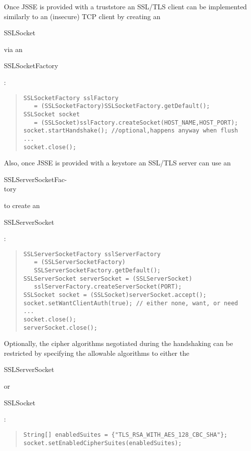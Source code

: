 Once JSSE is provided with a truststore an SSL/TLS client can be
implemented similarly to an (insecure) TCP client by creating an \begin{code}SSLSocket\end{code}
via an \begin{code}SSLSocketFactory\end{code}:
\begin{quote}\begin{code}\begin{verbatim}
SSLSocketFactory sslFactory
   = (SSLSocketFactory)SSLSocketFactory.getDefault();
SSLSocket socket
   = (SSLSocket)sslFactory.createSocket(HOST_NAME,HOST_PORT);
socket.startHandshake(); //optional,happens anyway when flush
...
socket.close();
\end{verbatim}\end{code}\end{quote}
Also, once JSSE is provided with a keystore an SSL/TLS server can use an
\begin{code}SSLServerSocketFac-\\tory\end{code} to create an \begin{code}SSLServerSocket\end{code}:
\begin{quote}\begin{code}\begin{verbatim}
SSLServerSocketFactory sslServerFactory
   = (SSLServerSocketFactory)
   SSLServerSocketFactory.getDefault();
SSLServerSocket serverSocket = (SSLServerSocket)
   sslServerFactory.createServerSocket(PORT);
SSLSocket socket = (SSLSocket)serverSocket.accept();
socket.setWantClientAuth(true); // either none, want, or need
...
socket.close();
serverSocket.close();
\end{verbatim}\end{code}\end{quote}
Optionally, the cipher algorithms negotiated during the handshaking
can be restricted by specifying the allowable algorithms to either the
\begin{code}SSLServerSocket\end{code} or \begin{code}SSLSocket\end{code}:
\begin{quote}\begin{code}\begin{verbatim}
String[] enabledSuites = {"TLS_RSA_WITH_AES_128_CBC_SHA"};
socket.setEnabledCipherSuites(enabledSuites);
\end{verbatim}\end{code}\end{quote}


